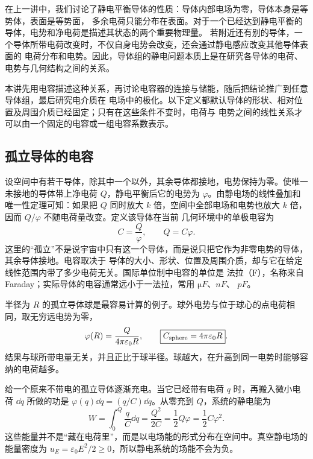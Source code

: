 在上一讲中，我们讨论了静电平衡导体的性质：导体内部电场为零，导体本身是等势体，表面是等势面，
多余电荷只能分布在表面。对于一个已经达到静电平衡的导体，电势和净电荷是描述其状态的两个重要物理量。
若附近还有别的导体，一个导体所带电荷改变时，不仅自身电势会改变，还会通过静电感应改变其他导体表面的
电荷分布和电势。因此，导体组的静电问题本质上是在研究各导体的电荷、电势与几何结构之间的关系。

本讲先用电容描述这种关系，再讨论电容器的连接与储能，随后把结论推广到任意导体组，最后研究电介质在
电场中的极化。以下定义都默认导体的形状、相对位置及周围介质已经固定；只有在这些条件不变时，电荷与
电势之间的线性关系才可以由一个固定的电容或一组电容系数表示。

\subsection*{孤立导体的电容}

设空间中有若干导体，除其中一个以外，其余导体都接地，电势保持为零。使唯一未接地的导体带上净电荷
$Q$，静电平衡后它的电势为 $\varphi$。由静电场的线性叠加和唯一性定理可知：如果把 $Q$ 同时放大
$k$ 倍，空间中全部电场和电势也放大 $k$ 倍，因而 $Q/\varphi$ 不随电荷量改变。定义该导体在当前
几何环境中的单极电容为
\begin{equation}
  \boxed{C=\frac{Q}{\varphi}},\qquad Q=C\varphi.
\end{equation}
这里的“孤立”不是说宇宙中只有这一个导体，而是说只把它作为非零电势的导体，其余导体接地。电容取决于
导体的大小、形状、位置及周围介质，却与它在给定线性范围内带了多少电荷无关。国际单位制中电容的单位是
法拉（F），名称来自 Faraday；实际导体的电容通常远小于一法拉，常用 $\si{\micro F}$、$\si{nF}$、
$\si{pF}$。

半径为 $R$ 的孤立导体球是最容易计算的例子。球外电势与位于球心的点电荷相同，取无穷远电势为零，
\begin{equation}
  \varphi(R)=\frac{Q}{4\pi\varepsilon_0R},
  \qquad
  \boxed{C_{\rm sphere}=4\pi\varepsilon_0R}.
\end{equation}
结果与球所带电量无关，并且正比于球半径。球越大，在升高到同一电势时能够容纳的电荷越多。

给一个原来不带电的孤立导体逐渐充电。当它已经带有电荷 $q$ 时，再搬入微小电荷 $\dd q$ 所做的功是
$\varphi(q)\dd q=(q/C)\dd q$。从零充到 $Q$，系统的静电能为
\begin{equation}
  W=\int_0^Q\frac{q}{C}\dd q
  =\boxed{\frac{Q^2}{2C}=\frac12Q\varphi=\frac12C\varphi^2}.
\end{equation}
这些能量并不是“藏在电荷里”，而是以电场能的形式分布在空间中。真空静电场的能量密度为
$u_E=\varepsilon_0E^2/2\geq0$，所以静电系统的场能不会为负。


